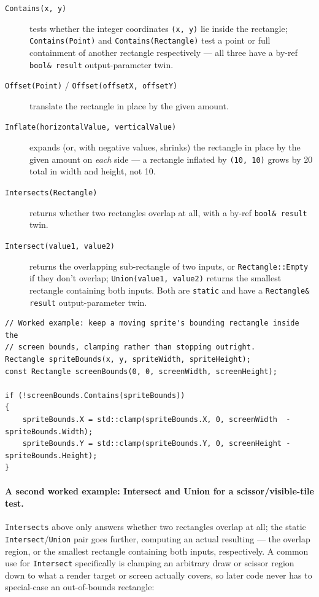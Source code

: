 \begin{description}
\item[\texttt{Contains(x, y)}] tests whether the integer coordinates \texttt{(x, y)} lie
  inside the rectangle; \texttt{Contains(Point)} and \texttt{Contains(Rectangle)} test a point
  or full containment of another rectangle respectively --- all three have a by-ref
  \texttt{bool\& result} output-parameter twin.
\item[\texttt{Offset(Point)} / \texttt{Offset(offsetX, offsetY)}] translate the rectangle in
  place by the given amount.
\item[\texttt{Inflate(horizontalValue, verticalValue)}] expands (or, with negative values,
  shrinks) the rectangle in place by the given amount on \emph{each} side --- a rectangle
  inflated by \texttt{(10, 10)} grows by 20 total in width and height, not 10.
\item[\texttt{Intersects(Rectangle)}] returns whether two rectangles overlap at all, with a
  by-ref \texttt{bool\& result} twin.
\item[\texttt{Intersect(value1, value2)}] returns the overlapping sub-rectangle of two inputs,
  or \texttt{Rectangle::Empty} if they don't overlap; \texttt{Union(value1, value2)} returns
  the smallest rectangle containing both inputs. Both are \texttt{static} and have a
  \texttt{Rectangle\& result} output-parameter twin.
\end{description}

\begin{lstlisting}
// Worked example: keep a moving sprite's bounding rectangle inside the
// screen bounds, clamping rather than stopping outright.
Rectangle spriteBounds(x, y, spriteWidth, spriteHeight);
const Rectangle screenBounds(0, 0, screenWidth, screenHeight);

if (!screenBounds.Contains(spriteBounds))
{
    spriteBounds.X = std::clamp(spriteBounds.X, 0, screenWidth  - spriteBounds.Width);
    spriteBounds.Y = std::clamp(spriteBounds.Y, 0, screenHeight - spriteBounds.Height);
}
\end{lstlisting}

\paragraph{A second worked example: Intersect and Union for a scissor/visible-tile test.}
\texttt{Intersects} above only answers whether two rectangles overlap at all; the static
\texttt{Intersect}/\texttt{Union} pair goes further, computing an actual resulting
 --- the overlap region, or the smallest rectangle containing both inputs,
respectively. A common use for \texttt{Intersect} specifically is clamping an arbitrary
draw or scissor region down to what a render target or screen actually covers, so later code
never has to special-case an out-of-bounds rectangle:

